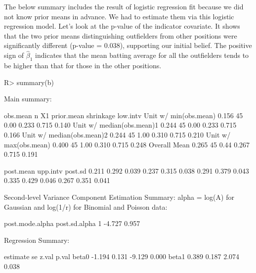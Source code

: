 \documentclass[article]{jss}
\begin{document}

The below summary includes the result of logistic regression fit because we did not know prior means in advance. We had to estimate them via this logistic regression model. Let's look at the p-value of the indicator covariate. It shows that the two prior means distinguishing outfielders from other positions were significantly different (p-value = 0.038), supporting our initial belief. The positive sign of $\hat{\beta}_{1}$ indicates that the mean batting average for all the outfielders tends to be higher than that for those in the other positions.

\begin{CodeChunk}
\begin{CodeInput}
R> summary(b)
\end{CodeInput}
\begin{CodeOutput}
Main summary:

                          obs.mean  n   X1 prior.mean shrinkage low.intv
Unit w/ min(obs.mean)        0.156 45 0.00      0.233     0.715    0.140
Unit w/ median(obs.mean)1    0.244 45 0.00      0.233     0.715    0.166
Unit w/ median(obs.mean)2    0.244 45 1.00      0.310     0.715    0.210
Unit w/ max(obs.mean)        0.400 45 1.00      0.310     0.715    0.248
Overall Mean                 0.265 45 0.44      0.267     0.715    0.191

                         post.mean upp.intv post.sd
                             0.211    0.292   0.039
                             0.237    0.315   0.038
                             0.291    0.379   0.043
                             0.335    0.429   0.046
                             0.267    0.351   0.041

Second-level Variance Component Estimation Summary:
alpha = log(A) for Gaussian and log(1/r) for Binomial and Poisson data:

  post.mode.alpha post.sd.alpha
1          -4.727         0.957


Regression Summary:

      estimate    se  z.val p.val
beta0   -1.194 0.131 -9.129 0.000
beta1    0.389 0.187  2.074 0.038
\end{CodeOutput}
\end{CodeChunk}
\end{document}
